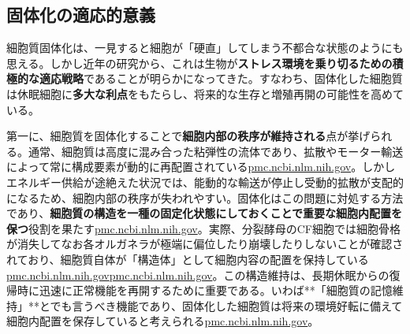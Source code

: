 \subsection{固体化の適応的意義}

細胞質固体化は、一見すると細胞が「硬直」してしまう不都合な状態のようにも思える。しかし近年の研究から、これは生物が\textbf{ストレス環境を乗り切るための積極的な適応戦略}であることが明らかになってきた。すなわち、固体化した細胞質は休眠細胞に\textbf{多大な利点}をもたらし、将来的な生存と増殖再開の可能性を高めている。

第一に、細胞質を固体化することで\textbf{細胞内部の秩序が維持される}点が挙げられる。通常、細胞質は高度に混み合った粘弾性の流体であり、拡散やモーター輸送によって常に構成要素が動的に再配置されている\href{https://pmc.ncbi.nlm.nih.gov/articles/PMC6857596/\#:~:text=N\%C3\%B8rrelykke\%20et\%20al,to\%20environmental\%20changes\%20requires\%20a}{pmc.ncbi.nlm.nih.gov}。しかしエネルギー供給が途絶えた状況では、能動的な輸送が停止し受動的拡散が支配的になるため、細胞内部の秩序が失われやすい。固体化はこの問題に対処する方法であり、\textbf{細胞質の構造を一種の固定化状態にしておくことで重要な細胞内配置を保つ}役割を果たす\href{https://pmc.ncbi.nlm.nih.gov/articles/PMC6857596/\#:~:text=provide\%20experimental\%20evidence\%20that\%2C\%20in,cellular\%20architecture\%20in\%20dormant\%20cells}{pmc.ncbi.nlm.nih.gov}。実際、分裂酵母のCF細胞では細胞骨格が消失してなお各オルガネラが極端に偏位したり崩壊したりしないことが確認されており、細胞質自体が「構造体」として細胞内容の配置を保持している\href{https://pmc.ncbi.nlm.nih.gov/articles/PMC6857596/\#:~:text=spherical\%20shape,cells\%2C\%20the\%20majority\%20of\%20CF}{pmc.ncbi.nlm.nih.gov}\href{https://pmc.ncbi.nlm.nih.gov/articles/PMC6857596/\#:~:text=spherical\%20shape\%2C\%20CF\%20cells\%20slipped,Fig}{pmc.ncbi.nlm.nih.gov}。この構造維持は、長期休眠からの復帰時に迅速に正常機能を再開するために重要である。いわば**「細胞質の記憶維持」**とでも言うべき機能であり、固体化した細胞質は将来の環境好転に備えて細胞内配置を保存していると考えられる\href{https://pmc.ncbi.nlm.nih.gov/articles/PMC6857596/\#:~:text=solidification\%20of\%20yeast\%20cells\%20described,cellular\%20architecture\%20in\%20dormant\%20cells}{pmc.ncbi.nlm.nih.gov}。

